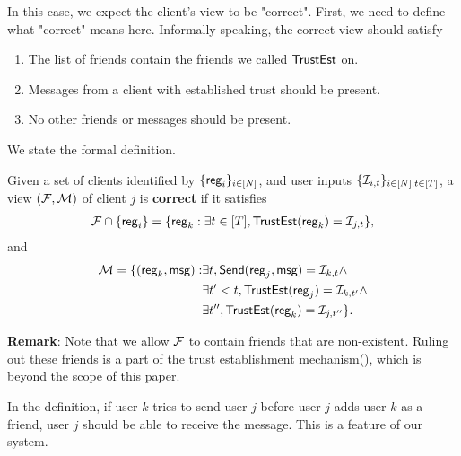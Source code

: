 
In this case, we expect the client's view to be "correct". First, we need to define what "correct" means here. Informally speaking, the correct view should satisfy
\begin{enumerate}
    \item The list of friends contain the friends we called $\mathsf{TrustEst}$ on.         
    \item Messages from a client with established trust should be present.  
    \item No other friends or messages should be present. 
\end{enumerate}
We state the formal definition.
\begin{definition}
\label{defn:client-view-correct}
Given a set of clients identified by $\{\mathsf{reg}_i\}_{i \in [N]}$, and user inputs $\{\mathcal{I}_{i, t}\}_{i \in [N], t \in [T]}$, a view $(\mathcal{F}, \mathcal{M})$ of client $j$ is \textbf{correct} if it satisfies
\begin{multline*}
\mathcal{F} \cap \{\mathsf{reg}_i\} = \{\mathsf{reg}_k: \exists t \in [T], \mathsf{TrustEst}(\mathsf{reg}_k) = \mathcal{I}_{j, t}\},    
\end{multline*}
and
\begin{align*}
 \mathcal{M} = \{(\mathsf{reg}_k, \mathsf{msg}): &\exists t, \mathsf{Send}(\mathsf{reg}_j, \mathsf{msg}) = \mathcal{I}_{k, t} \land \\
 &\exists t' < t, \mathsf{TrustEst}(\mathsf{reg}_j) = \mathcal{I}_{k, t'} \land \\
 &\exists t'', \mathsf{TrustEst}(\mathsf{reg}_k) = \mathcal{I}_{j, t''}\}.   
\end{align*}
\end{definition}
\textbf{Remark}: Note that we allow $\mathcal{F}$ to contain friends that are non-existent. Ruling out these friends is a part of the trust establishment mechanism(\cite[Section 4]{whitepaper}), which is beyond the scope of this paper. 

In the definition, if user $k$ tries to send user $j$ before user $j$ adds user $k$ as a friend, user $j$ should be able to receive the message. This is a feature of our system. 

